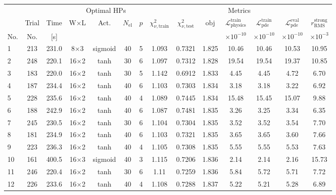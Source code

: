 \begin{tabular}{lcc cccc ccccccc}
\toprule
& & & \multicolumn{4}{c}{Optimal HPs} & \multicolumn{7}{c}{Metrics} \\
\cmidrule(lr){4-7}\cmidrule(lr){8-14}
& Trial & Time & W$\times$L & Act. & $N_{\mathrm{el}}$ & $p$ & $\chi^2_{\nu,\mathrm{train}}$ & $\chi^2_{\nu,\mathrm{test}}$ & $\mathrm{obj}$ & $\mathcal{L}_{\mathrm{physics}}^{\mathrm{train}}$ & $\mathcal{L}_{\mathrm{pde}}^{\mathrm{train}}$ & $\mathcal{L}_{\mathrm{pde}}^{\mathrm{eval}}$ & $r_{\mathrm{RMS}}^{\mathrm{strong}}$ \\
No. & No. & [s] &  &  &  &  &  &  &  & $\times 10^{-10}$ & $\times 10^{-10}$ & $\times 10^{-10}$ & $\times 10^{-3}$ \\
\midrule
  1 & 213 & 231.0 & 8$\times$3 & sigmoid & 40 & 5 & \num{1.093} & \num{0.7321} & \num{1.825} & 10.46 & 10.46 & 10.53 & 10.95 \\
  2 & 248 & 220.1 & 16$\times$2 & tanh & 30 & 6 & \num{1.097} & \num{0.7312} & \num{1.828} & 19.54 & 19.54 & 19.37 & 10.85 \\
  3 & 183 & 220.0 & 16$\times$2 & tanh & 30 & 5 & \num{1.142} & \num{0.6912} & \num{1.833} & 4.45 & 4.45 & 4.72 & 6.70 \\
  4 & 187 & 234.4 & 16$\times$2 & tanh & 40 & 6 & \num{1.103} & \num{0.7303} & \num{1.834} & 3.18 & 3.18 & 3.22 & 6.92 \\
  5 & 228 & 235.6 & 16$\times$2 & tanh & 40 & 4 & \num{1.089} & \num{0.7445} & \num{1.834} & 15.48 & 15.45 & 15.07 & 9.88 \\
  6 & 188 & 242.9 & 16$\times$2 & tanh & 40 & 6 & \num{1.087} & \num{0.7481} & \num{1.835} & 3.26 & 3.25 & 3.34 & 6.35 \\
  7 & 245 & 230.5 & 16$\times$2 & tanh & 30 & 6 & \num{1.104} & \num{0.7304} & \num{1.835} & 3.52 & 3.52 & 3.54 & 7.70 \\
  8 & 181 & 234.9 & 16$\times$2 & tanh & 40 & 6 & \num{1.103} & \num{0.7321} & \num{1.835} & 3.65 & 3.65 & 3.60 & 7.66 \\
  9 & 223 & 236.3 & 16$\times$2 & tanh & 40 & 4 & \num{1.105} & \num{0.7308} & \num{1.835} & 5.55 & 5.55 & 5.53 & 7.63 \\
  10 & 161 & 400.5 & 16$\times$3 & sigmoid & 40 & 3 & \num{1.115} & \num{0.7206} & \num{1.836} & 2.14 & 2.14 & 2.16 & 15.73 \\
  11 & 246 & 220.4 & 16$\times$2 & tanh & 30 & 6 & \num{1.11} & \num{0.7259} & \num{1.836} & 5.84 & 5.72 & 5.71 & 7.72 \\
  12 & 226 & 233.6 & 16$\times$2 & tanh & 40 & 4 & \num{1.108} & \num{0.7288} & \num{1.837} & 5.22 & 5.21 & 5.28 & 6.89 \\

\end{tabular}
